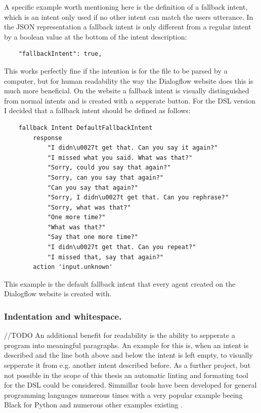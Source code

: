 A specific example worth mentioning here is the definition of a fallback intent, which is an intent only used if no other intent can match the users utterance.
In the JSON representation a fallback intent is only different from a regular intent by a boolean value at the bottom of the intent description:
\begin{verbatim}
    "fallbackIntent": true,
\end{verbatim}
This works perfectly fine if the intention is for the file to be parsed by a computer, but for human readability the way the Dialogflow website does this is much more beneficial.
On the website a fallback intent is visually distinguished from normal intents and is created with a sepperate button.
For the DSL version I decided that a fallback intent should be defined as follows:
\begin{verbatim}
    fallback Intent DefaultFallbackIntent
        response 
            "I didn\u0027t get that. Can you say it again?"
            "I missed what you said. What was that?"
            "Sorry, could you say that again?"
            "Sorry, can you say that again?"
            "Can you say that again?"
            "Sorry, I didn\u0027t get that. Can you rephrase?"
            "Sorry, what was that?"
            "One more time?"
            "What was that?"
            "Say that one more time?"
            "I didn\u0027t get that. Can you repeat?"
            "I missed that, say that again?"
        action 'input.unknown'
\end{verbatim}
This example is the default fallback intent that every agent created on the Dialogflow website is created with.

\subsubsection{Indentation and whitespace.}
//TODO
An additional benefit for readability is the ability to sepperate a program into meaningful paragraphs. An example for this is, when an intent is described and the line both above and below the intent is left empty, to visually sepperate it from e.g. another intent described before.
As a further project, but not possible in the scope of this thesis an automatic linting and formating tool for the DSL could be considered. Simmillar tools have been developed for general programming languages numerous times with a very popular example beeing Black for Python\cite{Python} and numerous other examples existing \cite{Github}.

